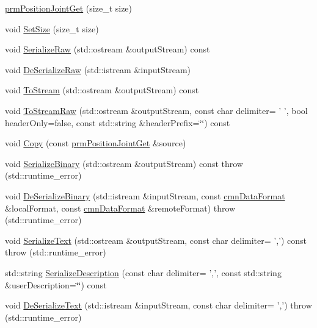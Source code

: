 \begin{DoxyCompactItemize}
\item 
\hyperlink{classprm_position_joint_get_a46958e4ad191dd0ea6734eddadea1468}{prm\-Position\-Joint\-Get} (size\-\_\-t size)
\item 
void \hyperlink{classprm_position_joint_get_a9a01d226c12a990de5e5d47b1b27b598}{Set\-Size} (size\-\_\-t size)
\item 
void \hyperlink{classprm_position_joint_get_a9064acf739897886317e7af36e98ce67}{Serialize\-Raw} (std\-::ostream \&output\-Stream) const 
\item 
void \hyperlink{classprm_position_joint_get_ae88c1c98bd875063f3d3a624359e3fe9}{De\-Serialize\-Raw} (std\-::istream \&input\-Stream)
\item 
void \hyperlink{classprm_position_joint_get_ae3abdf51680f23b094c15be562b46620}{To\-Stream} (std\-::ostream \&output\-Stream) const 
\item 
void \hyperlink{classprm_position_joint_get_af86770522846be112b6472118d73865b}{To\-Stream\-Raw} (std\-::ostream \&output\-Stream, const char delimiter= ' ', bool header\-Only=false, const std\-::string \&header\-Prefix=\char`\"{}\char`\"{}) const 
\item 
void \hyperlink{classprm_position_joint_get_aefbf8c9f16ee488e4fc1bff21f698ced}{Copy} (const \hyperlink{classprm_position_joint_get}{prm\-Position\-Joint\-Get} \&source)
\item 
void \hyperlink{classprm_position_joint_get_a827d9b3a5033c6c097bfa4d4c9f8f851}{Serialize\-Binary} (std\-::ostream \&output\-Stream) const   throw (std\-::runtime\-\_\-error)
\item 
void \hyperlink{classprm_position_joint_get_a13b6ae6cdc1d6c5044b6848118f0a0b4}{De\-Serialize\-Binary} (std\-::istream \&input\-Stream, const \hyperlink{classcmn_data_format}{cmn\-Data\-Format} \&local\-Format, const \hyperlink{classcmn_data_format}{cmn\-Data\-Format} \&remote\-Format)  throw (std\-::runtime\-\_\-error)
\item 
void \hyperlink{classprm_position_joint_get_adac2e3e3ab3a5bff049f132935bf822f}{Serialize\-Text} (std\-::ostream \&output\-Stream, const char delimiter= ',') const   throw (std\-::runtime\-\_\-error)
\item 
std\-::string \hyperlink{classprm_position_joint_get_a3dc5f435eefa591d48d4c3038f2ca0ec}{Serialize\-Description} (const char delimiter= ',', const std\-::string \&user\-Description=\char`\"{}\char`\"{}) const 
\item 
void \hyperlink{classprm_position_joint_get_a89976a5f76c463bafafe61273fe1f9c5}{De\-Serialize\-Text} (std\-::istream \&input\-Stream, const char delimiter= ',')  throw (std\-::runtime\-\_\-error)

\end{DoxyCompactItemize}

